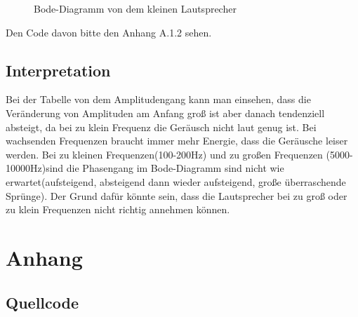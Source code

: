 \documentclass[12pt, oneside, a4paper, \docLanguage]{report}
\begin{document}
\begin{figure}[H]
\centering\small
{}
	\caption{Bode-Diagramm von dem kleinen Lautsprecher}
\end{figure}

Den Code davon bitte den Anhang A.1.2 sehen.

\section{Interpretation}
\label{chap:VERSUCH_2_INTERPRETATION}
Bei der Tabelle von dem Amplitudengang kann man einsehen, dass die Veränderung von Amplituden am Anfang groß ist aber danach tendenziell absteigt, da bei zu klein Frequenz die Geräusch nicht laut genug ist. Bei wachsenden Frequenzen braucht immer mehr Energie, dass die Geräusche leiser werden.
Bei zu kleinen Frequenzen(100-200Hz) und zu großen Frequenzen (5000-10000Hz)sind die Phasengang im Bode-Diagramm sind nicht wie erwartet(aufsteigend, absteigend dann wieder aufsteigend, große überraschende Sprünge). Der Grund dafür könnte sein, dass die Lautsprecher bei zu groß oder zu klein Frequenzen nicht richtig annehmen können.


%
%
\renewcommand\thesection{A.\arabic{section}}
\renewcommand\thesubsection{\thesection.\arabic{subsection}}

\chapter*{Anhang}
\label{chap:APPENDIX}
\addtocounter{chapter}{1}
\setcounter{section}{0}

\section{Quellcode}
\label{chap:APPENDIX_SOURCECODE}
\end{document}
